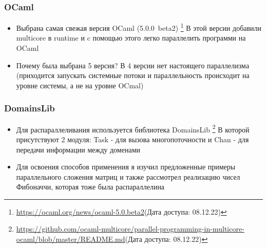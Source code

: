 \documentclass{beamer}
\begin{document}

\begin{frame}
  \frametitle{OCaml}
  \begin{itemize}
  \item Выбрана самая свежая версия OCaml (5.0.0~beta2)
  \footnote{\url{https://ocaml.org/news/ocaml-5.0.beta2}(Дата доступа: 08.12.22)}
  В этой версии добавили multicore в runtime и
  c помощью этого легко параллелить программи на OCaml
  \item Почему была выбрана 5 версия? В 4 версии нет настоящего параллелизма (приходится запускать системные потоки и параллельность происходит на уровне системы, а не на уровне OCmal)
  \end{itemize}
\end{frame}



  
\begin{frame}
  \frametitle{DomainsLib}
  \begin{itemize}
  \item Для распараллеливания используется библиотека DomainsLib
  \footnote{\url{https://github.com/ocaml-multicore/parallel-programming-in-multicore-ocaml/blob/master/README.md}(Дата доступа: 08.12.22)} 
  В которой присутствуют 2 модуля: Task - для вызова многопоточности и Chan - для передачи информации между доменами
  \item Для освоения способов применения я изучил предложенные примеры параллельного сложения матриц и также рассмотрел реализацию чисел Фибоначчи, которая тоже была распараллелина
  \end{itemize}
\end{frame}
\end{document}
